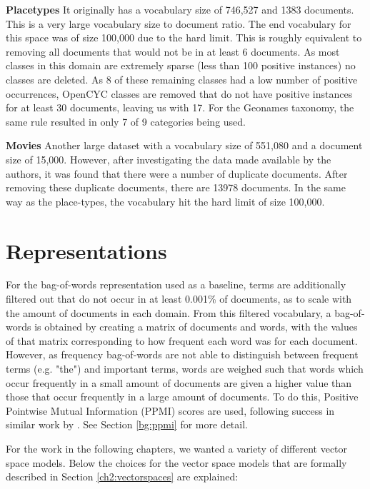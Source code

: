 \textbf{Placetypes} It originally has a vocabulary size of 746,527 and 1383 documents. This is a very large vocabulary size to document ratio. The end vocabulary for this space was of size 100,000 due to the hard limit. This is roughly equivalent to removing all documents that would not be in at least 6 documents. As most classes in this domain are extremely sparse (less than 100 positive instances) no classes are deleted. As 8 of these remaining classes had a low number of positive occurrences, OpenCYC classes are removed that do not have positive instances for at least 30 documents, leaving us with 17. For the Geonames taxonomy, the same rule resulted in only 7 of 9 categories being used.

\textbf{Movies} Another large dataset with a vocabulary size of 551,080 and a document size of 15,000. However, after investigating the data made available by the authors, it was found that there were a number of duplicate documents. After removing these duplicate documents, there are 13978 documents. In the same way as the place-types, the vocabulary hit the hard limit of size 100,000. 



\section{Representations}\label{ch25:reps}

For the bag-of-words representation used as a baseline, terms are additionally filtered out that do not occur in at least 0.001\% of documents, as to scale with the amount of documents in each domain. From this filtered vocabulary, a bag-of-words is obtained by creating a matrix of documents and words, with  the values of that matrix corresponding to how frequent each word was for each document. However, as frequency bag-of-words are not able to distinguish between frequent terms (e.g. "the") and important terms, words are weighed such that words which occur frequently in a small amount of documents are given a higher value than those that occur frequently in a large amount of documents. To do this, Positive Pointwise Mutual Information (PPMI) scores are used, following success in similar work by \cite{Derrac2015}. See Section \ref{bg:ppmi} for more detail.

For the work in the following chapters, we wanted a variety of different vector space models. Below the choices for the vector space models that are formally described in Section \ref{ch2:vectorspaces} are explained:


